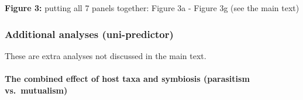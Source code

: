 \documentclass[
]{article}
\begin{document}
\textbf{Figure 3:} putting all 7 panels together: Figure 3a - Figure 3g
(see the main text)

\hypertarget{additional-analyses-uni-predictor}{%
\subsubsection{Additional analyses
(uni-predictor)}\label{additional-analyses-uni-predictor}}

These are extra analyses not discussed in the main text.

\hypertarget{the-combined-effect-of-host-taxa-and-symbiosis-parasitism-vs.-mutualism}{%
\paragraph{The combined effect of host taxa and symbiosis (parasitism
vs.~mutualism)}\label{the-combined-effect-of-host-taxa-and-symbiosis-parasitism-vs.-mutualism}}
\end{document}
